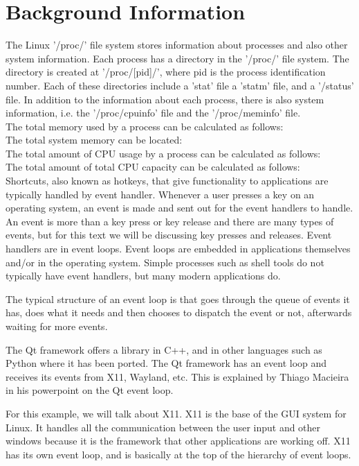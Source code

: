\documentclass[12pt]{article}
\begin{document}
	\section{Background Information}
	The Linux '/proc/' file system stores information about processes and also other system information. Each process has a directory in the '/proc/' file system\cite[p. 792]{text}. The directory is created at '/proc/[pid]/', where pid is the process identification number. Each of these directories include a 'stat' file a 'statm' file, and a '/status' file. In addition to the information about each process, there is also system information, i.e. the '/proc/cpuinfo' file and the '/proc/meminfo' file.\\
	The total memory used by a process can be calculated as follows:\\
	The total system memory can be located:\\
	The total amount of CPU usage by a process can be calculated as follows:\\
	The total amount of total CPU capacity can be calculated as follows:\\
	
Shortcuts, also known as hotkeys, that give functionality to applications are typically handled by event handler. Whenever a user presses a key on an operating system, an event is made and sent out for the event handlers to handle. An event is more than a key press or key release and there are many types of events, but for this text we will be discussing key presses and releases. Event handlers are in event loops. Event loops are embedded in applications themselves and/or in the operating system. Simple processes such as shell tools do not typically have event handlers, but many modern applications do.

The typical structure of an event loop is that goes through the queue of events it has, does what it needs and then chooses to dispatch the event or not, afterwards waiting for more events. 

The Qt framework offers a library in C++, and in other languages such as Python where it has been ported.
The Qt framework has an event loop and receives its events from X11, Wayland, etc.
This is explained by Thiago Macieira in his powerpoint on the Qt event loop\cite{QtSlides}.

For this example, we will talk about X11.
X11 is the base of the GUI system for Linux.
It handles all the communication between the user input and other windows because it is the framework that other applications are working off.
X11 has its own event loop, and is basically at the top of the hierarchy of event loops.
\end{document}
